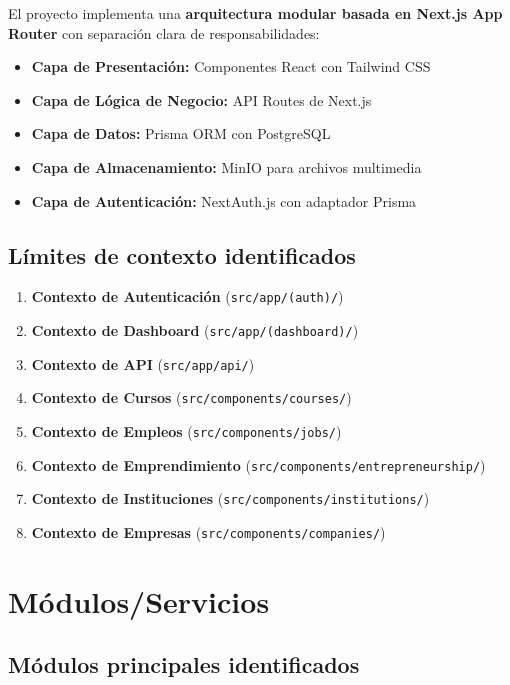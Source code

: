 \documentclass[12pt,a4paper]{article}
\begin{document}
El proyecto implementa una \textbf{arquitectura modular basada en Next.js App Router} con separación clara de responsabilidades:

\begin{itemize}
    \item \textbf{Capa de Presentación:} Componentes React con Tailwind CSS
    \item \textbf{Capa de Lógica de Negocio:} API Routes de Next.js
    \item \textbf{Capa de Datos:} Prisma ORM con PostgreSQL
    \item \textbf{Capa de Almacenamiento:} MinIO para archivos multimedia
    \item \textbf{Capa de Autenticación:} NextAuth.js con adaptador Prisma
\end{itemize}

\subsection{Límites de contexto identificados}

\begin{enumerate}
    \item \textbf{Contexto de Autenticación} (\texttt{src/app/(auth)/})
    \item \textbf{Contexto de Dashboard} (\texttt{src/app/(dashboard)/})
    \item \textbf{Contexto de API} (\texttt{src/app/api/})
    \item \textbf{Contexto de Cursos} (\texttt{src/components/courses/})
    \item \textbf{Contexto de Empleos} (\texttt{src/components/jobs/})
    \item \textbf{Contexto de Emprendimiento} (\texttt{src/components/entrepreneurship/})
    \item \textbf{Contexto de Instituciones} (\texttt{src/components/institutions/})
    \item \textbf{Contexto de Empresas} (\texttt{src/components/companies/})
\end{enumerate}

\section{Módulos/Servicios}

\subsection{Módulos principales identificados}
\end{document}
